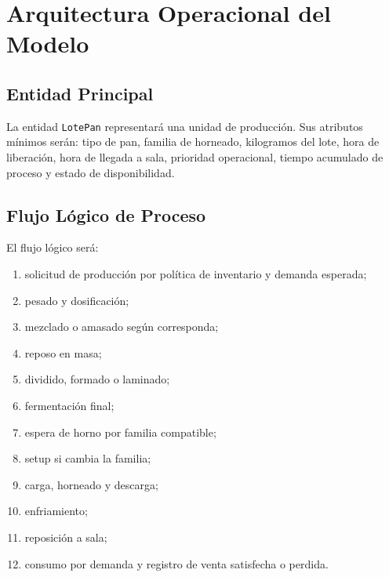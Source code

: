 \documentclass[11pt,letterpaper]{article}
\begin{document}
\section{Arquitectura Operacional del Modelo}

\subsection{Entidad Principal}

La entidad \texttt{LotePan} representará una unidad de producción. Sus atributos mínimos serán: tipo de pan, familia de horneado, kilogramos del lote, hora de liberación, hora de llegada a sala, prioridad operacional, tiempo acumulado de proceso y estado de disponibilidad.

\subsection{Flujo Lógico de Proceso}

El flujo lógico será:

\begin{enumerate}
  \item solicitud de producción por política de inventario y demanda esperada;
  \item pesado y dosificación;
  \item mezclado o amasado según corresponda;
  \item reposo en masa;
  \item dividido, formado o laminado;
  \item fermentación final;
  \item espera de horno por familia compatible;
  \item setup si cambia la familia;
  \item carga, horneado y descarga;
  \item enfriamiento;
  \item reposición a sala;
  \item consumo por demanda y registro de venta satisfecha o perdida.
\end{enumerate}
\end{document}
